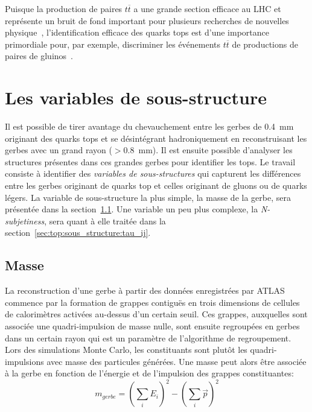 Puisque la production de paires $t\overline{t}$ a une grande
section efficace au LHC et représente un bruit de fond important pour
plusieurs recherches de nouvelles
physique~\cite{atlas_collaboration_measurement_2015}, l'identification
efficace des quarks tops est d'une importance primordiale pour, par
exemple, discriminer les événements $t\overline{t}$ de productions de
paires de gluinos~\cite{ATLAS-CONF-2015-067}.

\section{Les variables de sous-structure}
\label{sec:top:sous_structure}

Il est possible de tirer avantage du chevauchement entre les gerbes de
0.4~mm originant des quarks tops et se désintégrant hadroniquement en
reconstruisant les gerbes avec un grand rayon ($>0.8$~mm). Il est
ensuite possible d'analyser les structures présentes dans ces grandes
gerbes pour identifier les tops. Le travail consiste à identifier des
\emph{variables de sous-structures} qui capturent les différences
entre les gerbes originant de quarks top et celles originant de gluons
ou de quarks légers. La variable de sous-structure la plus simple, la
masse de la gerbe, sera présentée dans la
section~\ref{sec:top:sous_structure:masse}. Une variable un peu plus
complexe, la \emph{N-subjetiness}, sera quant à elle traitée dans la
section~\ref{sec:top:sous_structure:tau_ij}.

\subsection{Masse}
\label{sec:top:sous_structure:masse}

La reconstruction d'une gerbe à partir des données enregistrées par
ATLAS commence par la formation de grappes contiguës en trois
dimensions de cellules de calorimètres activées au-dessus d'un certain
seuil. Ces grappes, auxquelles sont associée une quadri-impulsion de
masse nulle, sont ensuite regroupées en gerbes dans un certain rayon
qui est un paramètre de l'algorithme de regroupement. Lors des
simulations Monte Carlo, les constituants sont plutôt les
quadri-impulsions avec masse des particules générées. Une masse peut
alors être associée à la gerbe en fonction de l'énergie et de
l'impulsion des grappes constituantes:
\begin{equation}
  m_{gerbe} = \left(\sum_iE_i\right)^2 - \left(\sum_i\overrightarrow{p}\right)^2
\end{equation}

